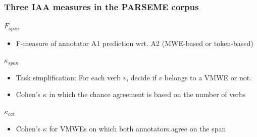 \documentclass[xcolor=dvipsnames]{beamer}
\begin{document}
\begin{frame}[label={iaa}]
  \vspace*{-5pt}
  \frametitle{Three IAA measures in the PARSEME corpus}


\begin{block}{$F_{span}$}
\begin{itemize}
\item F-measure of annotator A1 prediction wrt. A2 (MWE-based or token-based)
\end{itemize}
\end{block}

\begin{block}{$\kappa_{span}$}
\begin{itemize}
\item Task simplification: For each verb $v$, decide if $v$ belongs to a VMWE or not.
\item Cohen's $\kappa$ in which the chance agreement is based on the number of verbs
\end{itemize}
\end{block}

\begin{block}{$\kappa_{cat}$}
\begin{itemize}
\item Cohen's $\kappa$ for VMWEs on which both annotators agree on the span
\end{itemize}
\end{block}


\end{frame}
\end{document}

